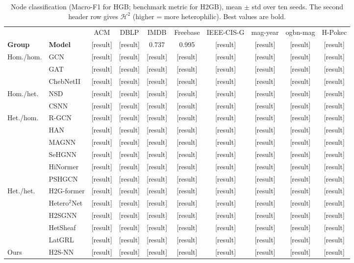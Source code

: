 \documentclass{article}
\newcommand{\method}{\textsc{H2S-NN}}
\newcommand{\res}{{\scriptsize[result]}}
\begin{document}
\begin{table}[t]
  \centering
  \caption{Node classification (Macro-F1 for HGB; benchmark metric for H2GB), mean $\pm$ std over ten seeds. The second header row gives $\mathcal{H}^2$ (higher = more heterophilic). Best values are bold.}
  \label{tab:node-cls}
  \footnotesize
  \setlength{\tabcolsep}{4pt}
  \begin{tabular}{llcccccccc}
    \toprule
    & & ACM & DBLP & IMDB & Freebase & IEEE-CIS-G & mag-year & ogbn-mag & H-Pokec \\
    \textbf{Group} & \textbf{Model} & \res & \res & 0.737 & 0.995 & \res & \res & \res & \res \\
    \midrule
    \multirow{3}{*}{Hom./hom.} & GCN & \res & \res & \res & \res & \res & \res & \res & \res \\
    & GAT & \res & \res & \res & \res & \res & \res & \res & \res \\
    & ChebNetII & \res & \res & \res & \res & \res & \res & \res & \res \\
    \midrule
    \multirow{2}{*}{Hom./het.} & NSD & \res & \res & \res & \res & \res & \res & \res & \res \\
    & CSNN & \res & \res & \res & \res & \res & \res & \res & \res \\
    \midrule
    \multirow{6}{*}{Het./hom.} & R-GCN & \res & \res & \res & \res & \res & \res & \res & \res \\
    & HAN & \res & \res & \res & \res & \res & \res & \res & \res \\
    & MAGNN & \res & \res & \res & \res & \res & \res & \res & \res \\
    & SeHGNN & \res & \res & \res & \res & \res & \res & \res & \res \\
    & HiNormer & \res & \res & \res & \res & \res & \res & \res & \res \\
    & PSHGCN & \res & \res & \res & \res & \res & \res & \res & \res \\
    \midrule
    \multirow{5}{*}{Het./het.} & H2G-former & \res & \res & \res & \res & \res & \res & \res & \res \\
    & Hetero$^2$Net & \res & \res & \res & \res & \res & \res & \res & \res \\
    & H2SGNN & \res & \res & \res & \res & \res & \res & \res & \res \\
    & HetSheaf & \res & \res & \res & \res & \res & \res & \res & \res \\
    & LatGRL & \res & \res & \res & \res & \res & \res & \res & \res \\
    \midrule
    Ours & \method{} & \res & \res & \res & \res & \res & \res & \res & \res \\
    \bottomrule
  \end{tabular}
\end{table}
\end{document}
